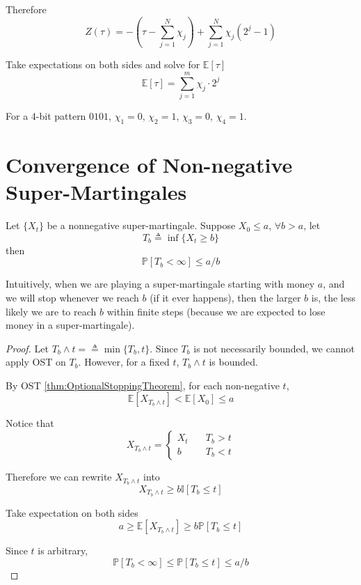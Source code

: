             Therefore
            \[Z(\tau) = -\left(\tau - \sum_{j=1}^N \chi_j\right) + \sum_{j=1}^N \chi_j(2^j-1)\]

            Take expectations on both sides and solve for $\mathbb{E}[\tau]$
            \[\mathbb{E}[\tau] = \sum_{j=1}^m\chi_j \cdot 2^j\]

            For a 4-bit pattern $0101$, $\chi_1=0$, $\chi_2 = 1$, $\chi_3=0$, $\chi_4=1$.


\section{Convergence of Non-negative Super-Martingales}
    \begin{proposition}\label{prop:BoundOnSuperMartingale}
        Let $\{X_t\}$ be a nonnegative super-martingale. Suppose $X_0 \le a $, $\forall b > a$, let
        \[ T_b \triangleq \inf\{ X_t \ge b \} \]
        then
        \[ \mathbb{P}[T_b < \infty] \le a/b \]
    \end{proposition}

    Intuitively, when we are playing a super-martingale starting with money $a$, and we will stop whenever we reach $b$ (if it ever happens), then the larger $b$ is, the less likely we are to reach $b$ within finite steps (because we are expected to lose money in a super-martingale).

    \begin{proof}
        Let $T_b \wedge t =\triangleq \min\{T_b, t\}$. Since $T_b$ is not necessarily bounded, we cannot apply OST on $T_b$. However, for a fixed $t$, $T_b \wedge t$ is bounded.

        By OST \ref{thm:OptionalStoppingTheorem}, for each non-negative $t$,
        \[ \mathbb{E}[X_{T_b \wedge t}] < \mathbb{E}[X_0] \le a \]

        Notice that
        \[ X_{T_b \wedge t} = \begin{cases}
            X_t &\quad T_b > t\\
            b &\quad T_b < t
        \end{cases} \]

        Therefore we can rewrite $X_{T_b \wedge t}$ into
        \[ X_{T_b \wedge t} \ge b\mathbb{I}[T_b \le t] \]

        Take expectation on both sides
        \[ a \ge \mathbb{E}[X_{T_b \wedge t}] \ge b\mathbb{P}[T_b \le t] \]

        Since $t$ is arbitrary,
        \[ \mathbb{P}[T_b < \infty] \le \mathbb{P}[T_b \le t] \le a/b \]
    \end{proof}

